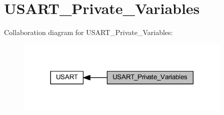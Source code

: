 \hypertarget{group___u_s_a_r_t___private___variables}{}\section{U\+S\+A\+R\+T\+\_\+\+Private\+\_\+\+Variables}
\label{group___u_s_a_r_t___private___variables}
Collaboration diagram for U\+S\+A\+R\+T\+\_\+\+Private\+\_\+\+Variables\+:
\nopagebreak
\begin{figure}[H]
\begin{center}
\leavevmode
\includegraphics[width=294pt]{group___u_s_a_r_t___private___variables}
\end{center}
\end{figure}
